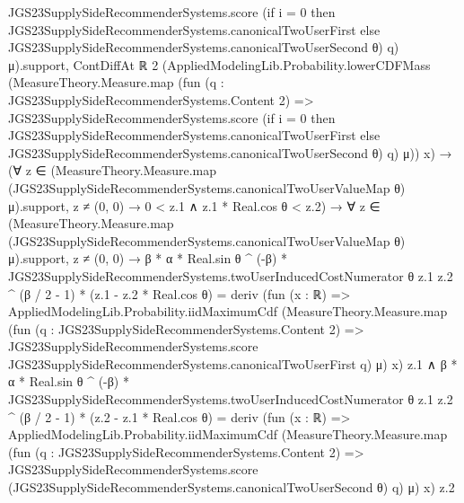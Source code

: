 \documentclass[10pt]{article}
\begin{document}
\begin{ReviewVerbatim}
                              JGS23SupplySideRecommenderSystems.score
                                (if i = 0 then JGS23SupplySideRecommenderSystems.canonicalTwoUserFirst
                                else JGS23SupplySideRecommenderSystems.canonicalTwoUserSecond θ)
                                q)
                            μ).support,
                      ContDiffAt ℝ 2
                        (AppliedModelingLib.Probability.lowerCDFMass
                          (MeasureTheory.Measure.map
                            (fun (q : JGS23SupplySideRecommenderSystems.Content 2) =>
                              JGS23SupplySideRecommenderSystems.score
                                (if i = 0 then JGS23SupplySideRecommenderSystems.canonicalTwoUserFirst
                                else JGS23SupplySideRecommenderSystems.canonicalTwoUserSecond θ)
                                q)
                            μ))
                        x) →
                  (∀
                      z ∈
                        (MeasureTheory.Measure.map (JGS23SupplySideRecommenderSystems.canonicalTwoUserValueMap θ)
                            μ).support,
                      z ≠ (0, 0) → 0 < z.1 ∧ z.1 * Real.cos θ < z.2) →
                    ∀
                      z ∈
                        (MeasureTheory.Measure.map (JGS23SupplySideRecommenderSystems.canonicalTwoUserValueMap θ)
                            μ).support,
                      z ≠ (0, 0) →
                        β * α * Real.sin θ ^ (-β) *
                                JGS23SupplySideRecommenderSystems.twoUserInducedCostNumerator θ z.1 z.2 ^ (β / 2 - 1) *
                              (z.1 - z.2 * Real.cos θ) =
                            deriv
                              (fun (x : ℝ) =>
                                AppliedModelingLib.Probability.iidMaximumCdf
                                  (MeasureTheory.Measure.map
                                    (fun (q : JGS23SupplySideRecommenderSystems.Content 2) =>
                                      JGS23SupplySideRecommenderSystems.score
                                        JGS23SupplySideRecommenderSystems.canonicalTwoUserFirst q)
                                    μ)
                                  x)
                              z.1 ∧
                          β * α * Real.sin θ ^ (-β) *
                                JGS23SupplySideRecommenderSystems.twoUserInducedCostNumerator θ z.1 z.2 ^ (β / 2 - 1) *
                              (z.2 - z.1 * Real.cos θ) =
                            deriv
                              (fun (x : ℝ) =>
                                AppliedModelingLib.Probability.iidMaximumCdf
                                  (MeasureTheory.Measure.map
                                    (fun (q : JGS23SupplySideRecommenderSystems.Content 2) =>
                                      JGS23SupplySideRecommenderSystems.score
                                        (JGS23SupplySideRecommenderSystems.canonicalTwoUserSecond θ) q)
                                    μ)
                                  x)
                              z.2
\end{ReviewVerbatim}
\end{document}
